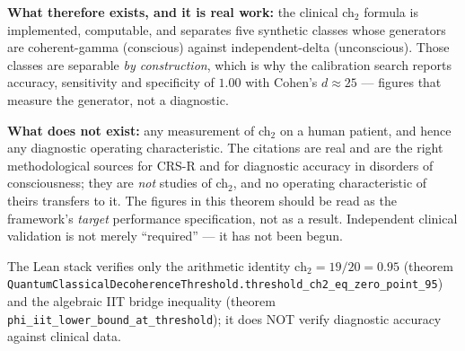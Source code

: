 \begin{theorem}
{\textbf{What therefore exists, and it is real work:} the clinical ch$_2$
formula is implemented, computable, and separates five synthetic classes whose
generators are coherent-gamma (conscious) against independent-delta
(unconscious). Those classes are separable \emph{by construction}, which is why
the calibration search reports accuracy, sensitivity and specificity of
$1.00$ with Cohen's $d \approx 25$ --- figures that measure the generator, not
a diagnostic.

\textbf{What does not exist:} any measurement of ch$_2$ on a human patient, and
hence any diagnostic operating characteristic. The citations
\cite{giacino2004,schnakers2009,edlow2021recovery} are real and are the right
methodological sources for CRS-R and for diagnostic accuracy in disorders of
consciousness; they are \emph{not} studies of ch$_2$, and no operating
characteristic of theirs transfers to it. The figures in this theorem should be
read as the framework's \emph{target} performance specification, not as a
result. Independent clinical validation is not merely ``required'' --- it has
not been begun.

The Lean stack verifies only the
arithmetic identity $\text{ch}_2 = 19/20 = 0.95$ (theorem
\texttt{Quantum\allowbreak{}Classical\allowbreak{}Decoherence\allowbreak{}Threshold.\allowbreak{}threshold\_\allowbreak{}ch2\_\allowbreak{}eq\_\allowbreak{}zero\_\allowbreak{}point\_\allowbreak{}95})
and the algebraic IIT bridge inequality (theorem
\texttt{phi\_\allowbreak{}iit\_\allowbreak{}lower\_\allowbreak{}bound\_\allowbreak{}at\_\allowbreak{}threshold}); it does NOT
verify diagnostic accuracy against clinical data.}
\end{theorem}

